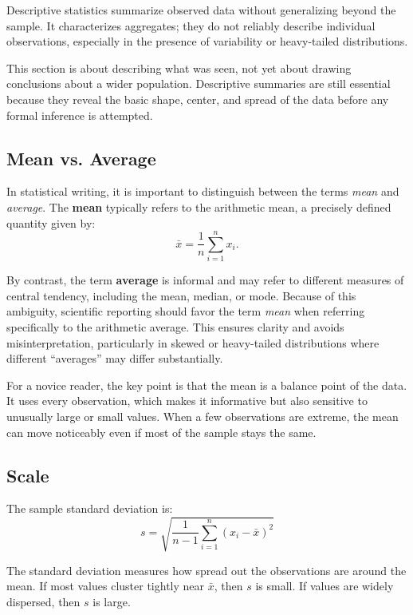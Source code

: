 \documentclass[11pt]{article}
\begin{document}
Descriptive statistics summarize observed data without generalizing beyond the sample.
It characterizes aggregates; they do not reliably describe individual observations, especially in the presence of variability or heavy-tailed distributions.

This section is about describing what was seen, not yet about drawing conclusions about a wider population. Descriptive summaries are still essential because they reveal the basic shape, center, and spread of the data before any formal inference is attempted.

\subsection{Mean vs. Average}

In statistical writing, it is important to distinguish between the terms \emph{mean} and \emph{average}. The \textbf{mean} typically refers to the arithmetic mean, a precisely defined quantity given by:
\begin{equation}
\bar{x} = \frac{1}{n} \sum_{i=1}^{n} x_i.
\end{equation}

By contrast, the term \textbf{average} is informal and may refer to different measures of central tendency, including the mean, median, or mode. Because of this ambiguity, scientific reporting should favor the term \emph{mean} when referring specifically to the arithmetic average. This ensures clarity and avoids misinterpretation, particularly in skewed or heavy-tailed distributions where different ``averages'' may differ substantially.

For a novice reader, the key point is that the mean is a balance point of the data. It uses every observation, which makes it informative but also sensitive to unusually large or small values. When a few observations are extreme, the mean can move noticeably even if most of the sample stays the same.

\subsection{Scale}

The sample standard deviation is:
\begin{equation}
s = \sqrt{\frac{1}{n-1} \sum_{i=1}^n (x_i - \bar{x})^2}
\end{equation}

The standard deviation measures how spread out the observations are around the mean. If most values cluster tightly near $\bar{x}$, then $s$ is small. If values are widely dispersed, then $s$ is large.
\end{document}
